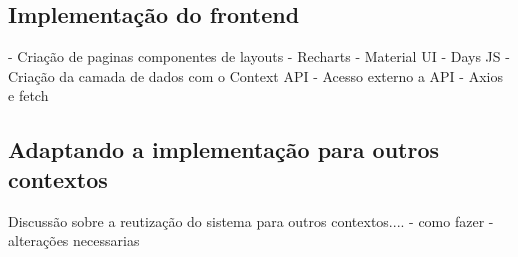 \subsection[Implementação do frontend]{Implementação do frontend}
- Criação de paginas componentes de layouts
- Recharts
- Material UI
- Days JS
- Criação da camada de dados com o Context API
- Acesso externo a API
- Axios e fetch

\subsection[Adaptando a implementação para outros contextos]{Adaptando a implementação para outros contextos}
Discussão sobre a reutização do sistema para outros contextos....
- como fazer
- alterações necessarias
